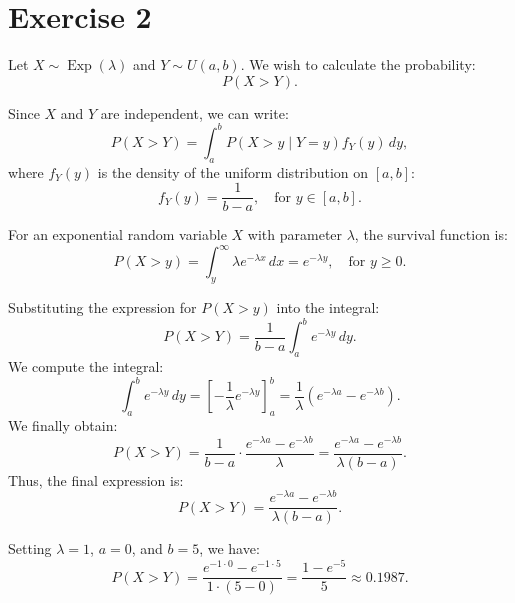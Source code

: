 \documentclass[a4paper,12pt]{article}
\begin{document}
\section{Exercise 2}

Let $X \sim \operatorname{Exp}(\lambda)$ and $Y \sim U(a,b)$. We wish to calculate the probability:
\[
P(X > Y).
\]

Since $X$ and $Y$ are independent, we can write:
\[
P(X > Y) = \int_a^b P(X > y \mid Y = y) f_Y(y) \, dy,
\]
where $f_Y(y)$ is the density of the uniform distribution on $[a,b]$:
\[
f_Y(y) = \frac{1}{b-a}, \quad \text{for } y \in [a,b].
\]

For an exponential random variable $X$ with parameter $\lambda$, the survival function is:
\[
P(X > y) = \int_y^\infty \lambda e^{-\lambda x} \, dx = e^{-\lambda y}, \quad \text{for } y \ge 0.
\]

Substituting the expression for $P(X > y)$ into the integral:
\[
P(X > Y) = \frac{1}{b-a} \int_a^b e^{-\lambda y} \, dy.
\]
We compute the integral:
\[
\int_a^b e^{-\lambda y} \, dy = \left[ -\frac{1}{\lambda} e^{-\lambda y} \right]_a^b = \frac{1}{\lambda}\left(e^{-\lambda a} - e^{-\lambda b}\right).
\]
We finally obtain:
\[
P(X > Y) = \frac{1}{b-a} \cdot \frac{e^{-\lambda a} - e^{-\lambda b}}{\lambda} = \frac{e^{-\lambda a} - e^{-\lambda b}}{\lambda (b-a)}.
\]
Thus, the final expression is:
\[
\boxed{P(X > Y) = \frac{e^{-\lambda a} - e^{-\lambda b}}{\lambda (b-a)}.}
\]

Setting $\lambda=1$, $a=0$, and $b=5$, we have:
\[
P(X > Y) = \frac{e^{-1\cdot 0} - e^{-1\cdot 5}}{1\cdot (5-0)} = \frac{1 - e^{-5}}{5} \approx 0.1987.
\]
\end{document}
